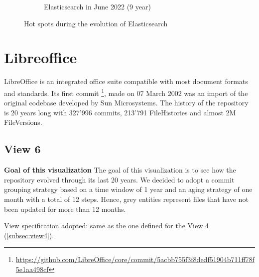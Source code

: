 \begin{figure}[h!]
\begin{subfigure}{0.48\textwidth}
        \caption{Elasticsearch in June 2022 (9 year)} 
        \label{fig:Elastic_V5_V3S6}
    \end{subfigure}
    
    \caption{Hot spots during the evolution of Elasticsearch} 
    \label{fig:Elastic_V5}
\end{figure}



\section{Libreoffice}
LibreOffice is an integrated office suite compatible with most document formats and standards. Its first commit \footnote{\url{https://github.com/LibreOffice/core/commit/5acbb755f3f8dedf51904b711ff78f5e1aa498cf}}, made on 07 March 2002 was an import of the original codebase developed by Sun Microsystems. The history of the repository is 20 years long with 327'996 commits, 213'791 FileHistories and almost 2M FileVersions. 

\subsection{View 6}
\textbf{Goal of this visualization}
The goal of this visualization is to see how the repository evolved through its last 20 years. We decided to adopt a commit grouping strategy based on a time window of 1 year and an aging strategy of one month with a total of 12 steps. Hence, grey entities represent files that have not been updated for more than 12 months. 

\bigbreak
View specification adopted: same as the one defined for the View 4 (\autoref{subsec:view4}).

